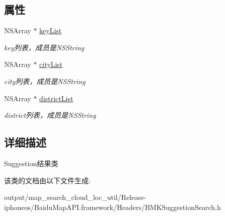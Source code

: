 \subsection*{属性}
\begin{DoxyCompactItemize}
\item 
\hypertarget{interface_b_m_k_suggestion_result_a799c815afa6706915ba59cb1b917696f}{}N\+S\+Array $\ast$ \hyperlink{interface_b_m_k_suggestion_result_a799c815afa6706915ba59cb1b917696f}{key\+List}\label{interface_b_m_k_suggestion_result_a799c815afa6706915ba59cb1b917696f}

\begin{DoxyCompactList}\small\item\em key列表，成员是\+N\+S\+String \end{DoxyCompactList}\item 
\hypertarget{interface_b_m_k_suggestion_result_a84e062c301ca7d07ebd586cbbb995c8c}{}N\+S\+Array $\ast$ \hyperlink{interface_b_m_k_suggestion_result_a84e062c301ca7d07ebd586cbbb995c8c}{city\+List}\label{interface_b_m_k_suggestion_result_a84e062c301ca7d07ebd586cbbb995c8c}

\begin{DoxyCompactList}\small\item\em city列表，成员是\+N\+S\+String \end{DoxyCompactList}\item 
\hypertarget{interface_b_m_k_suggestion_result_ac60b5de3361f806d6bc4266a5c450d42}{}N\+S\+Array $\ast$ \hyperlink{interface_b_m_k_suggestion_result_ac60b5de3361f806d6bc4266a5c450d42}{district\+List}\label{interface_b_m_k_suggestion_result_ac60b5de3361f806d6bc4266a5c450d42}

\begin{DoxyCompactList}\small\item\em district列表，成员是\+N\+S\+String \end{DoxyCompactList}\end{DoxyCompactItemize}


\subsection{详细描述}
Suggestion结果类 

该类的文档由以下文件生成\+:\begin{DoxyCompactItemize}
\item 
output/map\+\_\+search\+\_\+cloud\+\_\+loc\+\_\+util/\+Release-\/iphoneos/\+Baidu\+Map\+A\+P\+I.\+framework/\+Headers/B\+M\+K\+Suggestion\+Search.\+h\end{DoxyCompactItemize}
